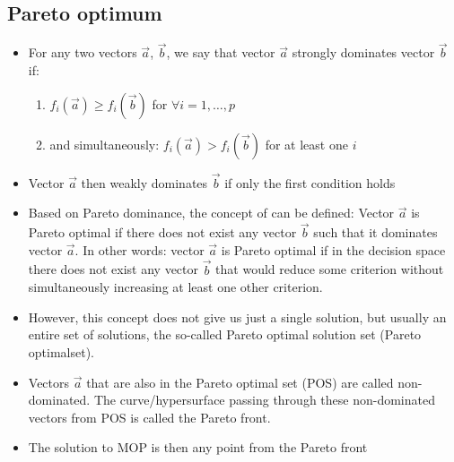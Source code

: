 \subsection{Pareto optimum}
\begin{itemize}
  \item For any two vectors $\vec{a}$, $\vec{b}$, we say that vector $\vec{a}$ strongly
  dominates vector $\vec{b}$ if:
  \begin{enumerate}
    \item $f_i(\vec{a}) \geq f_i(\vec{b})$ for $\forall i = 1,\dots, p$
    \item and simultaneously: $f_i(\vec{a}) > f_i(\vec{b})$ for at least one $i$
  \end{enumerate}
  \item Vector $\vec{a}$ then weakly dominates $\vec{b}$ if only the first condition holds
  \item Based on Pareto dominance, the concept of  can be defined:
  Vector $\vec{a}$ is Pareto optimal if there does not exist any vector $\vec{b}$ such that it dominates vector $\vec{a}$.
  In other words: vector $\vec{a}$ is Pareto optimal if in the decision
  space there does not exist any vector $\vec{b}$ that would reduce some criterion without simultaneously increasing at least one other criterion.
  \item However, this concept does not give us just a single solution, but usually an entire set of solutions,
  the so-called Pareto optimal solution set (Pareto optimalset).
  \item Vectors $\vec{a}$ that are also in the Pareto optimal set (POS) are
called non-dominated. The curve/hypersurface passing through these non-dominated vectors from POS is
called the Pareto front.
  \item The solution to MOP is then any point from the Pareto front
\end{itemize}

